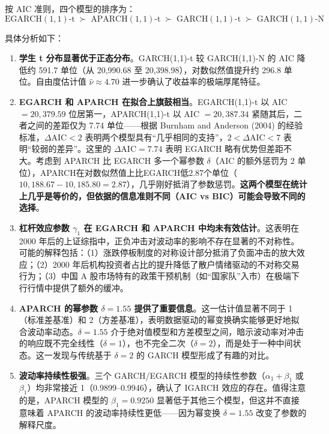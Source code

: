 \documentclass[12pt,a4paper]{article}
\begin{document}
按 AIC 准则，四个模型的排序为：
\begin{equation}
\mathrm{EGARCH(1,1)\text{-}t} \;\succ\; \mathrm{APARCH(1,1)\text{-}t} \;\succ\; \mathrm{GARCH(1,1)\text{-}t} \;\succ\; \mathrm{GARCH(1,1)\text{-}N}
\label{eq:ranking}
\end{equation}

具体分析如下：

\begin{enumerate}[nosep,label=(\arabic*)]
    \item \textbf{学生 t 分布显著优于正态分布}。GARCH(1,1)-t 较 GARCH(1,1)-N 的 AIC 降低约 591.7 单位（从 20{,}990.68 至 20{,}398.98），对数似然值提升约 296.8 单位。自由度估计值 $\hat{\nu} \approx 4.70$ 进一步确认了收益率的极端厚尾特征。

    \item \textbf{EGARCH 和 APARCH 在拟合上旗鼓相当}。EGARCH(1,1)-t 以 AIC $= 20{,}379.59$ 位居第一，APARCH(1,1)-t 以 AIC $= 20{,}387.34$ 紧随其后，二者之间的差距仅为 7.74 单位——根据 Burnham and Anderson (2004) 的经验标准，$\Delta\mathrm{AIC} < 2$ 表明两个模型具有``几乎相同的支持''，$2 < \Delta\mathrm{AIC} < 7$ 表明``较弱的差异''。这里的 $\Delta\mathrm{AIC} = 7.74$ 表明 EGARCH 略有优势但差距不大。考虑到 APARCH 比 EGARCH 多一个幂参数 $\delta$（AIC 的额外惩罚为 2 单位），APARCH在对数似然值上比EGARCH低2.87个单位（$10{,}188.67-10{,}185.80=2.87$），几乎刚好抵消了参数惩罚。\textbf{这两个模型在统计上几乎是等价的，但依据的信息准则不同（AIC vs BIC）可能会导致不同的选择}。

    \item \textbf{杠杆效应参数 $\gamma_1$ 在 EGARCH 和 APARCH 中均未有效估计}。这表明在 2000 年后的上证综指中，正负冲击对波动率的影响不存在显著的不对称性。可能的解释包括：（1）涨跌停板制度的对称设计部分抵消了负面冲击的放大效应；（2）2000 年后机构投资者占比的提升降低了散户情绪驱动的不对称交易行为；（3）中国 A 股市场特有的政策干预机制（如``国家队''入市）在极端下行行情中提供了额外的缓冲。

    \item \textbf{APARCH 的幂参数 $\delta = 1.55$ 提供了重要信息}。这一估计值显著不同于 1（标准差基准）和 2（方差基准），表明数据驱动的幂变换确实能够更好地拟合波动率动态。$\delta = 1.55$ 介于绝对值模型和方差模型之间，暗示波动率对冲击的响应既不完全线性（$\delta = 1$），也不完全二次（$\delta = 2$），而是处于一种中间状态。这一发现与传统基于 $\delta = 2$ 的 GARCH 模型形成了有趣的对比。

    \item \textbf{波动率持续性极强}。三个 GARCH/EGARCH 模型的持续性参数（$\alpha_1 + \beta_1$ 或 $\beta_1$）均非常接近 1（0.9899--0.9946），确认了 IGARCH 效应的存在。值得注意的是，APARCH 模型的 $\beta_1 = 0.9250$ 显著低于其他三个模型，但这并不直接意味着 APARCH 的波动率持续性更低——因为幂变换 $\delta = 1.55$ 改变了参数的解释尺度。
\end{enumerate}
\end{document}
